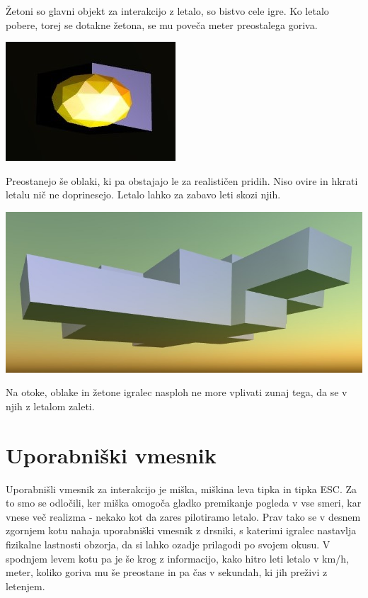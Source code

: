 \documentclass[a4paper]{article}
\begin{document}
Žetoni so glavni objekt za interakcijo z letalo, so bistvo cele igre. Ko letalo pobere, torej se dotakne žetona, se mu poveča meter preostalega goriva.
\begin{center}
     \includegraphics[width=\columnwidth]{zeton.jpg}
\end{center}

Preostanejo še oblaki, ki pa obstajajo le za realističen pridih. Niso ovire in hkrati letalu nič ne doprinesejo. Letalo lahko za zabavo leti skozi njih.
\begin{center}
     \includegraphics[width=\columnwidth]{Oblak.jpg}
\end{center}

Na otoke, oblake in žetone igralec nasploh ne more vplivati zunaj tega, da se v njih z letalom zaleti. 

\section{Uporabniški vmesnik}%
Uporabnišli vmesnik za interakcijo je miška, miškina leva tipka in tipka ESC. Za to smo se odločili, ker miška omogoča gladko premikanje pogleda v vse smeri, kar vnese več realizma - nekako kot da zares pilotiramo letalo. Prav tako se v desnem zgornjem kotu nahaja uporabniški vmesnik z drsniki, s katerimi igralec nastavlja fizikalne lastnosti obzorja, da si lahko ozadje prilagodi po svojem okusu. V spodnjem levem kotu pa je še krog z informacijo, kako hitro leti letalo v km/h, meter, koliko goriva mu še preostane in pa čas v sekundah, ki jih preživi z letenjem.
\end{document}
